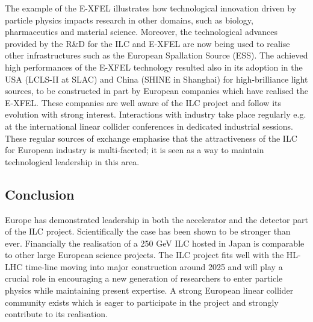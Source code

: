 \documentclass[%
 reprint,
 floatfix,
 amsmath,amssymb,
 aps,
]{revtex4-1}
\begin{document}
The example of the E-XFEL illustrates how technological innovation driven by particle physics impacts research in other domains, such as biology, pharmaceutics and material science. Moreover, the technological advances provided by the R\&D for the ILC and E-XFEL are now being used to realise other infrastructures such as the European Spallation Source (ESS).
The achieved high performances of the E-XFEL technology resulted also in its adoption in the USA (LCLS-II at SLAC) and China (SHINE in Shanghai) for high-brilliance light sources, to be constructed in part by European companies which have realised the E-XFEL. These companies are well aware of the ILC project and follow its evolution with strong interest. Interactions with industry take place regularly e.g. at the international linear collider conferences in dedicated industrial sessions. These regular sources of exchange emphasise that the attractiveness of the ILC for European industry is multi-faceted; 
it is seen as a way to maintain technological leadership in this area. 

\subsection{Conclusion}
Europe has demonstrated leadership in both the accelerator and the detector part of the ILC project. Scientifically the case has been shown to be stronger than ever. Financially the realisation of a 250 GeV ILC hosted in Japan is comparable to other large European science projects. The ILC project fits well with the HL-LHC time-line moving into major construction around 2025 and will play a crucial role in encouraging a new generation of researchers to enter particle physics while maintaining present expertise. A strong European linear collider community exists which is eager to participate in the project and strongly contribute to its realisation. 







\onecolumngrid
\newpage
\end{document}
